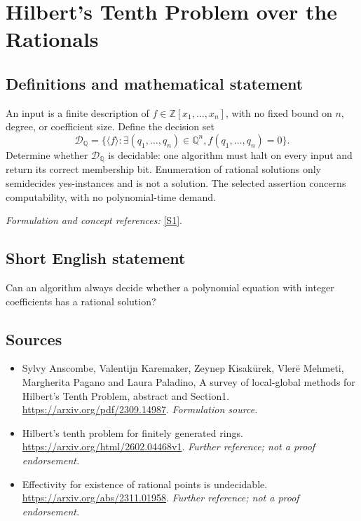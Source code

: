 \documentclass[11pt]{article}
\begin{document}
\section*{\texorpdfstring{Hilbert's Tenth Problem over the Rationals}{Hilbert's Tenth Problem over the Rationals}}\label{21}
\subsection{Definitions and mathematical statement}
An input is a finite description of $f\in{\mathbb{Z}}[x_1,\ldots,x_n]$, with no fixed bound on $n$, degree, or coefficient size. Define the decision set
\[
 \mathcal D_{{\mathbb{Q}}}=\{\langle f\rangle:\exists(q_1,\ldots,q_n)\in{\mathbb{Q}}^n,
                                  f(q_1,\ldots,q_n)=0\}.
\]
Determine whether $\mathcal D_{{\mathbb{Q}}}$ is decidable: one algorithm must halt on every input and return its correct membership bit. Enumeration of rational solutions only semidecides yes-instances and is not a solution. The selected assertion concerns computability, with no polynomial-time demand.
\par\smallskip\textit{Formulation and concept references:} \href{https://arxiv.org/pdf/2309.14987}{[S1]}.

\subsection{Short English statement}
Can an algorithm always decide whether a polynomial equation with integer coefficients has a rational solution?
\subsection{Sources}
\begin{itemize}
\item[S1]Sylvy Anscombe, Valentijn Karemaker, Zeynep Kisakürek, Vlerë Mehmeti, Margherita Pagano and Laura Paladino, A survey of local-global methods for Hilbert's Tenth Problem, abstract and Section1.
\url{https://arxiv.org/pdf/2309.14987}.
\textit{Formulation source.}
\item[S2]Hilbert's tenth problem for finitely generated rings.
\url{https://arxiv.org/html/2602.04468v1}.
\textit{Further reference; not a proof endorsement.}
\item[S3]Effectivity for existence of rational points is undecidable.
\url{https://arxiv.org/abs/2311.01958}.
\textit{Further reference; not a proof endorsement.}
\end{itemize}
\end{document}
